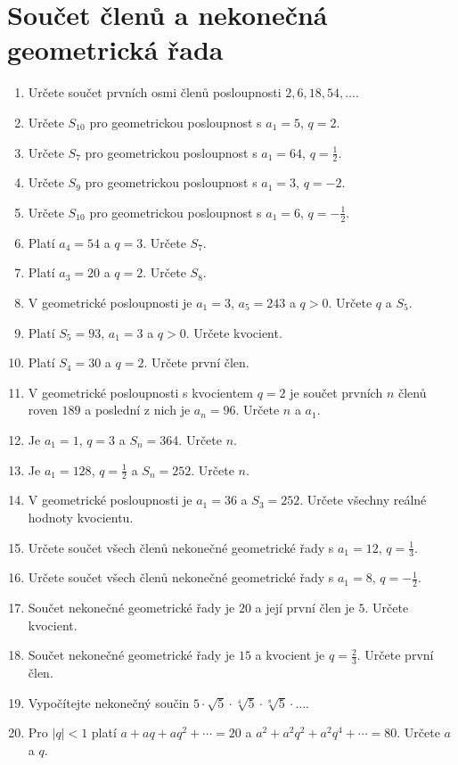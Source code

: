 \documentclass[12pt,a4paper]{article}
\begin{document}
\section*{Součet členů a nekonečná geometrická řada}
\begin{enumerate}[label=\arabic*.,start=36]
    \item Určete součet prvních osmi členů posloupnosti $2,6,18,54,\ldots$.
    \item Určete $S_{10}$ pro geometrickou posloupnost s $a_1=5$, $q=2$.
    \item Určete $S_7$ pro geometrickou posloupnost s $a_1=64$, $q=\frac12$.
    \item Určete $S_9$ pro geometrickou posloupnost s $a_1=3$, $q=-2$.
    \item Určete $S_{10}$ pro geometrickou posloupnost s $a_1=6$, $q=-\frac12$.
    \item Platí $a_4=54$ a $q=3$. Určete $S_7$.
    \item Platí $a_3=20$ a $q=2$. Určete $S_8$.
    \item V geometrické posloupnosti je $a_1=3$, $a_5=243$ a $q>0$. Určete $q$ a $S_5$.
    \item Platí $S_5=93$, $a_1=3$ a $q>0$. Určete kvocient.
    \item Platí $S_4=30$ a $q=2$. Určete první člen.
    \item V geometrické posloupnosti s kvocientem $q=2$ je součet prvních $n$ členů roven $189$ a poslední z nich je $a_n=96$. Určete $n$ a $a_1$.
    \item Je $a_1=1$, $q=3$ a $S_n=364$. Určete $n$.
    \item Je $a_1=128$, $q=\frac12$ a $S_n=252$. Určete $n$.
    \item V geometrické posloupnosti je $a_1=36$ a $S_3=252$. Určete všechny reálné hodnoty kvocientu.
    \item Určete součet všech členů nekonečné geometrické řady s $a_1=12$, $q=\frac13$.
    \item Určete součet všech členů nekonečné geometrické řady s $a_1=8$, $q=-\frac12$.
    \item Součet nekonečné geometrické řady je $20$ a její první člen je $5$. Určete kvocient.
    \item Součet nekonečné geometrické řady je $15$ a kvocient je $q=\frac23$. Určete první člen.
    \item Vypočítejte nekonečný součin $5\cdot\sqrt5\cdot\sqrt[4]{5}\cdot\sqrt[8]{5}\cdot\ldots$.
    \item Pro $|q|<1$ platí $a+aq+aq^2+\cdots=20$ a $a^2+a^2q^2+a^2q^4+\cdots=80$. Určete $a$ a $q$.
\end{enumerate}
\end{document}

